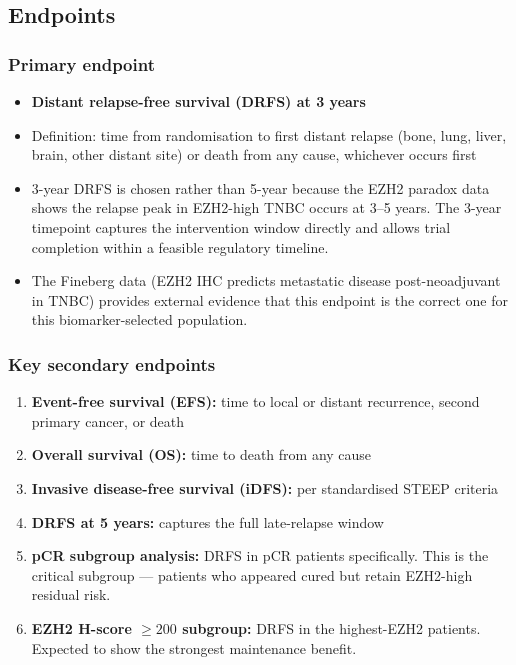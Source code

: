 \documentclass[12pt, a4paper]{article}
\begin{document}
\subsection{Endpoints}

\subsubsection{Primary endpoint}

\begin{itemize}
  \item \textbf{Distant relapse-free survival (DRFS)
        at 3 years}

  \item Definition: time from randomisation to
        first distant relapse (bone, lung, liver,
        brain, other distant site) or death from
        any cause, whichever occurs first

  \item 3-year DRFS is chosen rather than 5-year
        because the EZH2 paradox data shows the
        relapse peak in EZH2-high TNBC occurs
        at 3--5 years. The 3-year timepoint
        captures the intervention window directly
        and allows trial completion within a
        feasible regulatory timeline.

  \item The Fineberg data (EZH2 IHC predicts
        metastatic disease post-neoadjuvant in TNBC)
        provides external evidence that this
        endpoint is the correct one for this
        biomarker-selected population.
\end{itemize}

\subsubsection{Key secondary endpoints}

\begin{enumerate}
  \item \textbf{Event-free survival (EFS):} time
        to local or distant recurrence, second
        primary cancer, or death

  \item \textbf{Overall survival (OS):}
        time to death from any cause

  \item \textbf{Invasive disease-free survival
        (iDFS):} per standardised STEEP criteria

  \item \textbf{DRFS at 5 years:}
        captures the full late-relapse window

  \item \textbf{pCR subgroup analysis:}
        DRFS in pCR patients specifically.
        This is the critical subgroup --- patients
        who appeared cured but retain EZH2-high
        residual risk.

  \item \textbf{EZH2 H-score $\geq200$ subgroup:}
        DRFS in the highest-EZH2 patients.
        Expected to show the strongest maintenance
        benefit.
\end{enumerate}
\end{document}
